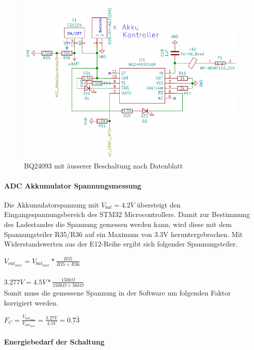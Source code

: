 \begin{figure} [H]
\begin{center}
\includegraphics[scale=0.5]{../graphics/Schema_Akku.png}
\caption{BQ24093 mit äusserer Beschaltung nach Datenblatt}
\label{fig:Schema_Akku}
\end{center}
\end{figure}

\paragraph{ADC Akkumulator Spannungsmessung}

Die Akkumulatorspannung mit ${V_{bat}=4.2\si{V}}$ übersteigt den Eingangsspannungsbereich des STM32 Microcontrollers.
Damit zur Bestimmung des Ladestandes die Spannung gemessen werden kann, wird diese mit dem Spannungsteiler R35/R36 auf ein Maximum von 3.3\si{V} heruntergebrochen. 
Mit Widerstandswerten aus der E12-Reihe ergibt sich folgender Spannungsteiler.

${V_{out_{max}} = V_{bat_{max}}*\frac{R35}{R35+R36}}$\\
\\
${3.277\si{V} = 4.5\si{V}*\frac{150\si{k\Omega}}{150\si{k\Omega}+56\si{k\Omega}}}$\\

Somit muss die gemessene Spannung in der Software um folgenden Faktor korrigiert werden.

${F_C=\frac{V_{bat_{max}}}{V_{out_{max}}}=\frac{3.27\si{V}}{4.5\si{V}}=\underline{0.7\bar{3}}}$

\paragraph{Energiebedarf der Schaltung}

